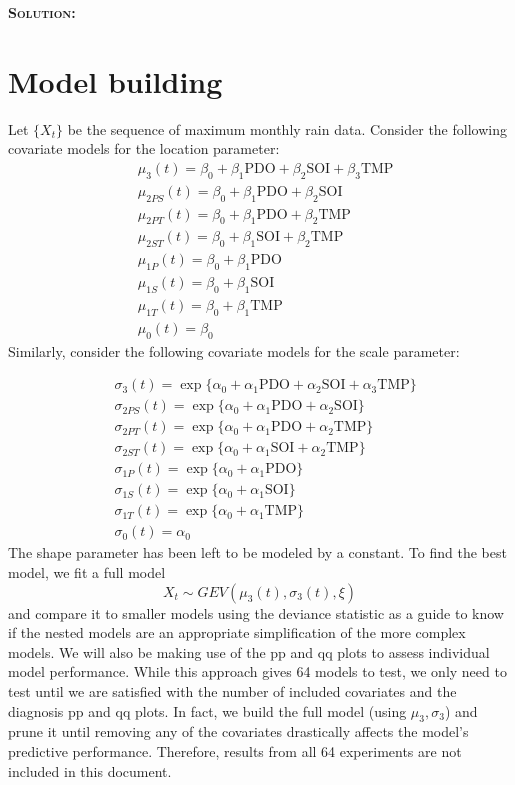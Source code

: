 \documentclass[12pt,oneside]{article}
\newenvironment{solution}
    {\textbf{\textsc{Solution:}}\\}
    {\newpage}
\begin{document}
\begin{solution}
\section*{Model building}
Let $\{X_t\}$ be the sequence of maximum monthly rain data. Consider the following covariate models for the location parameter:
\begin{align*}
    & \mu_3(t)=\beta_0+\beta_1\text{PDO}+\beta_2\text{SOI}+ \beta_3\text{TMP}\\
    & \mu_{2PS}(t)=\beta_0+\beta_1\text{PDO}+\beta_2\text{SOI}\\
    & \mu_{2PT}(t)=\beta_0+\beta_1\text{PDO}+\beta_2\text{TMP}\\
    & \mu_{2ST}(t)=\beta_0+\beta_1\text{SOI}+ \beta_2\text{TMP}\\
    & \mu_{1P}(t)=\beta_0+\beta_1\text{PDO}\\
    & \mu_{1S}(t)=\beta_0+\beta_1\text{SOI}\\
    & \mu_{1T}(t)=\beta_0+\beta_1\text{TMP}\\
    & \mu_0(t)=\beta_0
\end{align*}
Similarly, consider the following covariate models for the scale parameter:

\begin{align*}
    & \sigma_3(t)=\exp\{\alpha_0+\alpha_1\text{PDO}+\alpha_2\text{SOI}+ \alpha_3\text{TMP}\}\\
    & \sigma_{2PS}(t)=\exp\{\alpha_0+\alpha_1\text{PDO}+\alpha_2\text{SOI}\}\\
    & \sigma_{2PT}(t)=\exp\{\alpha_0+\alpha_1\text{PDO}+\alpha_2\text{TMP}\}\\
    & \sigma_{2ST}(t)=\exp\{\alpha_0+\alpha_1\text{SOI}+ \alpha_2\text{TMP}\}\\
    & \sigma_{1P}(t)=\exp\{\alpha_0+\alpha_1\text{PDO}\}\\
    & \sigma_{1S}(t)=\exp\{\alpha_0+\alpha_1\text{SOI}\}\\
    & \sigma_{1T}(t)=\exp\{\alpha_0+\alpha_1\text{TMP}\}\\
    & \sigma_0(t)=\alpha_0
\end{align*}
The shape parameter has been left to be modeled by a constant. To find the best model, we fit a full model
\[X_t\sim GEV(\mu_3(t),\sigma_3(t), \xi) \]
and compare it to smaller models using the deviance statistic as a guide to know if the nested models are an appropriate simplification of the more complex models. We will also be making use of the pp and qq plots to assess individual model performance. While this approach gives 64 models to test, we only need to test until we are satisfied with the number of included covariates and the diagnosis pp and qq plots. In fact, we build the full model (using $\mu_3, \sigma_3$) and prune it until removing any of the covariates drastically affects the model's predictive performance. Therefore, results from all 64 experiments are not included in this document.


\end{solution}
\end{document}
